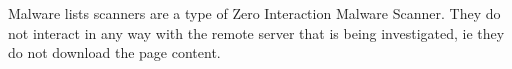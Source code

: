 Malware lists scanners are a type of Zero Interaction Malware Scanner. They do not interact in any way with the remote server that is being investigated, ie they do not download the page content.


